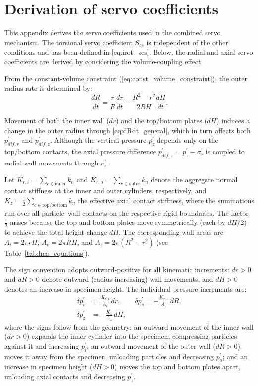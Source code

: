 \documentclass[a4paper,fleqn]{cas-sc}
\makeatletter
\providecommand{\DIFadd}[1]{{\protect\color{blue}\uwave{#1}}} %
\providecommand{\DIFdel}[1]{{\protect\color{red}\sout{#1}}} %
\providecommand{\DIFaddbegin}{} %
\providecommand{\DIFaddend}{} %
\providecommand{\DIFdelbegin}{} %
\providecommand{\DIFdelend}{} %
\let\sout@orig\sout %
\renewcommand{\sout}[1]{\ifmmode\text{\sout@orig{\ensuremath{#1}}}\else\sout@orig{#1}\fi} %
\makeatother
\begin{document}
 \section{Derivation of servo coefficients}
\label{sec:appendix_servo}

This appendix derives the servo coefficients used in the combined servo mechanism. The torsional servo coefficient \DIFdelbegin \DIFdel{$S_{cs}$ }\DIFdelend \DIFaddbegin \DIFadd{$S_T$ }\DIFaddend is independent of the other conditions and has been defined in \cref{eq:irot_scs}. Below, the radial and axial servo coefficients are derived by considering the volume-coupling effect.

From the constant-volume constraint (\cref{eq:const_volume_constraint}), the outer radius rate is determined by:
\begin{equation}
\frac{dR}{dt} = \frac{r}{R}\frac{dr}{dt} - \frac{R^2-r^2}{2RH}\frac{dH}{dt}.
\label{eq:dRdt_general}
\end{equation}

Movement of both the inner wall ($dr$) and the top/bottom plates ($dH$) induces a change in the outer radius through \cref{eq:dRdt_general}, which in turn affects both $p_{dif,r}^{\prime}$ and $p_{dif,z}^{\prime}$. Although the vertical pressure $p_z^{\prime}$ depends only on the top/bottom contacts, the axial pressure difference $p_{dif,z}^{\prime}=p_z^{\prime}-\sigma_r^{\prime}$ is coupled to radial wall movements through $\sigma_r^{\prime}$.

Let $K_{r,i}=\sum_{c\in\mathrm{inner}} k_n$ and $K_{r,o}=\sum_{c\in\mathrm{outer}} k_n$ denote the aggregate normal contact stiffness at the inner and outer cylinders, respectively, and $K_z=\frac{1}{2}\sum_{c\in\mathrm{top/bottom}} k_n$ the effective axial contact stiffness, where the summations run over all particle--wall contacts on the respective rigid boundaries. The factor $\frac{1}{2}$ arises because the top and bottom plates move symmetrically (each by $dH/2$) to achieve the total height change $dH$. The corresponding wall areas are $A_i=2\pi rH$, $A_o=2\pi RH$, and $A_z=2\pi(R^2-r^2)$ (see Table~\ref{tab:hca_equations}).

The sign convention adopts outward-positive for all kinematic increments: $dr>0$ and $dR>0$ denote outward (radius-increasing) wall movements, and $dH>0$ denotes an increase in specimen height. The individual pressure increments are:
\begin{align}
\delta p_i^{\prime} &= \frac{K_{r,i}}{A_i}\,dr,\qquad
\delta p_o^{\prime} = -\frac{K_{r,o}}{A_o}\,dR, \label{eq:dp_individual_r}\\[4pt]
\delta p_z^{\prime} &= -\frac{K_z}{A_z}\,dH, \label{eq:dp_individual_z}
\end{align}
where the signs follow from the geometry: an outward movement of the inner wall ($dr>0$) expands the inner cylinder into the specimen, compressing particles against it and increasing $p_i^{\prime}$; an outward movement of the outer wall ($dR>0$) moves it away from the specimen, unloading particles and decreasing $p_o^{\prime}$; and an increase in specimen height ($dH>0$) moves the top and bottom plates apart, unloading axial contacts and decreasing $p_z^{\prime}$.
\end{document}
